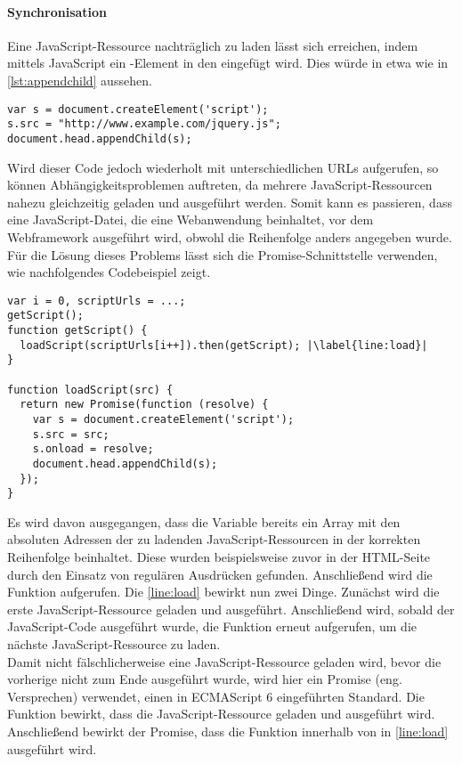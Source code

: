 \paragraph{Synchronisation}
Eine JavaScript-Ressource nachträglich zu laden lässt sich erreichen, indem mittels JavaScript ein -Element in den  eingefügt wird. Dies würde in etwa wie in \autoref{lst:appendchild} aussehen.

\begin{lstlisting}[style=htmlcssjs, caption=Nachladen einer JavaScript-Ressource, label=lst:appendchild]
var s = document.createElement('script');
s.src = "http://www.example.com/jquery.js";
document.head.appendChild(s);
\end{lstlisting}

Wird dieser Code jedoch wiederholt mit unterschiedlichen URLs aufgerufen, so können Abhängigkeitsproblemen auftreten, da mehrere JavaScript-Ressourcen nahezu gleichzeitig geladen und ausgeführt werden. Somit kann es passieren, dass eine JavaScript-Datei, die eine Webanwendung beinhaltet, vor dem Webframework ausgeführt wird, obwohl die Reihenfolge anders angegeben wurde.
Für die Lösung dieses Problems lässt sich die Promise-Schnittstelle verwenden, wie nachfolgendes Codebeispiel zeigt.

\begin{lstlisting}[style=htmlcssjs, caption=Laden und Synchronisieren von JavaScript-Ressourcen, label=lst:js-syncro,escapechar=|]
var i = 0, scriptUrls = ...;
getScript();
function getScript() {
  loadScript(scriptUrls[i++]).then(getScript); |\label{line:load}|
}

function loadScript(src) {
  return new Promise(function (resolve) {
    var s = document.createElement('script');
    s.src = src;
    s.onload = resolve;
    document.head.appendChild(s);
  });
}
\end{lstlisting}

Es wird davon ausgegangen, dass die Variable  bereits ein Array mit den absoluten Adressen der zu ladenden JavaScript-Ressourcen in der korrekten Reihenfolge beinhaltet. Diese wurden beispielsweise zuvor in der HTML-Seite durch den Einsatz von regulären Ausdrücken gefunden. Anschließend wird die Funktion  aufgerufen. Die \autoref{line:load} bewirkt nun zwei Dinge. Zunächst wird die erste JavaScript-Ressource geladen und ausgeführt. Anschließend wird, sobald der JavaScript-Code ausgeführt wurde, die Funktion erneut aufgerufen, um die nächste JavaScript-Ressource zu laden. \\
Damit nicht fälschlicherweise eine JavaScript-Ressource geladen wird, bevor die vorherige nicht zum Ende ausgeführt wurde, wird hier ein Promise (eng. Versprechen) verwendet, einen in ECMAScript 6 eingeführten Standard. Die Funktion bewirkt, dass die JavaScript-Ressource geladen und ausgeführt wird. Anschließend bewirkt der Promise, dass die Funktion  innerhalb von  in \autoref{line:load} ausgeführt wird.